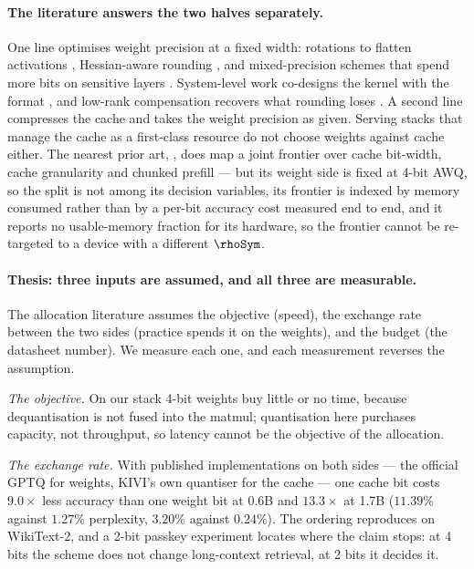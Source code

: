 \paragraph*{The literature answers the two halves separately.}
One line optimises weight precision at a fixed width: rotations to flatten
activations \cite{quarot,spinquant,duquant,sun2024}, Hessian-aware rounding
\cite{gptq,frantar2022}, and mixed-precision schemes that spend more bits on
sensitive layers \cite{hawqv2,mixllm,gamma,alignquant,wang2018}. System-level
work co-designs the kernel with the format
\cite{lin2024,zhao2023,wei2024,guo2026,mixquant}, and low-rank compensation
recovers what rounding loses \cite{song2026,park2026,liu2025}. A second line
compresses the cache \cite{kivi,kvquant,mixkvq,kvpareto,duanmu2024,su2025,he2024}
and takes the weight precision as given. Serving stacks that manage the cache as
a first-class resource \cite{kwon2023} do not choose weights against cache
either. The nearest prior art, \cite{kvpareto}, does map a joint frontier over
cache bit-width, cache granularity and chunked prefill --- but its weight side is
fixed at 4-bit AWQ, so the split is not among its decision variables, its
frontier is indexed by memory consumed rather than by a per-bit accuracy cost
measured end to end, and it reports no usable-memory fraction for its hardware,
so the frontier cannot be re-targeted to a device with a different $\rhoSym$.

\paragraph*{Thesis: three inputs are assumed, and all three are measurable.}
The allocation literature assumes the objective (speed), the exchange rate
between the two sides (practice spends it on the weights), and the budget (the
datasheet number). We measure each one, and each measurement reverses the
assumption.

\emph{The objective.} On our stack 4-bit weights buy little or no time, because
dequantisation is not fused into the matmul; quantisation here purchases
capacity, not throughput, so latency cannot be the objective of the allocation.

\emph{The exchange rate.} With published implementations on both sides --- the
official GPTQ for weights, KIVI's own quantiser for the cache --- one cache bit
costs $9.0\times$ less accuracy than one weight bit at 0.6B and $13.3\times$ at
1.7B ($11.39\%$ against $1.27\%$ perplexity, $3.20\%$ against $0.24\%$). The
ordering reproduces on WikiText-2, and a 2-bit passkey experiment locates where
the claim stops: at 4 bits the scheme does not change long-context retrieval, at
2 bits it decides it.

